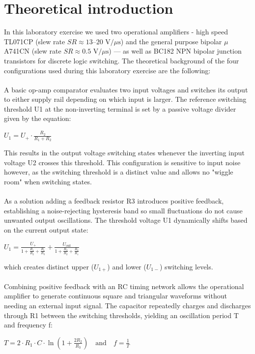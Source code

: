 \documentclass[12pt]{article}
\begin{document}
\section{Theoretical introduction}
In this laboratory exercise we used two operational amplifiers - high speed 
TL071CP (slew rate $SR \approx 13\text{--}20\text{ V}/\mu\text{s}$) and the 
general purpose bipolar $\mu$A741CN (slew rate $SR \approx 0.5\text{ V}/\mu\text{s}$) 
— as well as BC182 NPN bipolar junction transistors for discrete logic switching.
The theoretical background of the four configurations used during this laboratory 
exercise are the following:\\\\
A basic op-amp comparator evaluates two input voltages and switches its output to 
either supply rail depending on which input is larger. The reference switching threshold U1 
at the non-inverting terminal is set by a passive voltage divider given by the equation: 
\begin{center} $U_1 = U_+ \cdot \frac{R_2}{R_1 + R_2}$ \end{center}
This results in the output voltage switching states whenever the inverting input voltage 
U2 crosses this threshold. This configuration is sensitive to input noise however, 
as the switching threshold is a distinct value and allows no "wiggle room" when switching states.\\\\
As a solution adding a feedback resistor R3 introduces positive feedback, establishing a noise-rejecting hysteresis band so small fluctuations do not cause unwanted output oscillations. The threshold voltage U1 dynamically shifts based on the current output state:
\begin{center} $U_1 = \frac{U_+}{1 + \frac{R_1}{R_2} + \frac{R_1}{R_3}} + \frac{U_{\text{out}}}{1 + \frac{R_3}{R_2} + \frac{R_3}{R_1}}$ \end{center}
which creates distinct upper ($U_{1+}$) and lower ($U_{1-}$) switching levels.\\\\
Combining positive feedback with an RC timing network allows the operational amplifier to generate continuous square and triangular waveforms without needing an external input signal. The capacitor repeatedly charges and discharges through R1 between the switching thresholds, yielding an oscillation period T and frequency f: 
\begin{center} $T = 2 \cdot R_1 \cdot C \cdot \ln\left(1 + \frac{2 R_2}{R_3}\right) \quad \text{and} \quad f = \frac{1}{T}$ \end{center}
\end{document}
